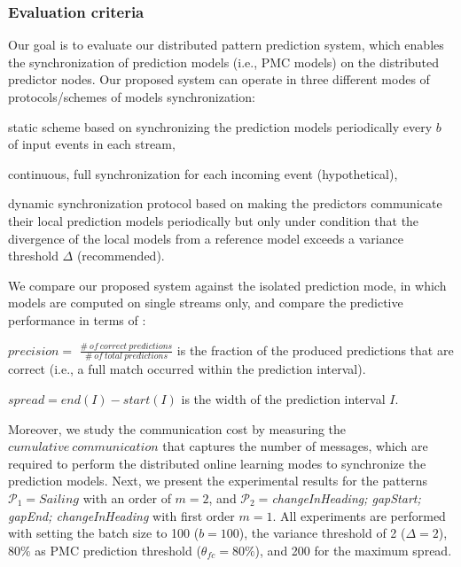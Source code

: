 \subsubsection*{Evaluation criteria} Our goal is to evaluate our distributed pattern prediction system, which enables the synchronization of prediction models (i.e., PMC models) on the distributed predictor nodes. Our proposed system can operate in three different modes of  protocols/schemes of models synchronization: \begin{enumerate*}[label=(\roman*)] 
	\item static scheme based on synchronizing the prediction models periodically every $b$ of input events in each stream, 
\item continuous, full synchronization for each incoming event (hypothetical), 
\item dynamic synchronization protocol based on making the predictors communicate their local prediction models periodically but only under condition that the divergence of the local models from a reference model exceeds a variance threshold $\Delta$ (recommended).  	   

\end{enumerate*}
\par We compare our proposed system against the isolated prediction mode, in which models are computed on single streams only, and compare the predictive performance in terms of :
\begin{enumerate*}[label=(\roman*)]
	
\item  $\mathit{precision} =$ $ \mathit{\frac{\#\ of\ correct\ predictions}{\#\ of\ total\ predictions}}$ is the fraction of the produced predictions that are correct (i.e., a full match occurred within the prediction interval).   

\item $\mathit{spread} =end(I) -start(I)$ is the width of the prediction interval $I$. 

\end{enumerate*} 
\par Moreover, we study the communication cost by measuring the $\mathit{cumulative\ communication}$ that captures the number of messages, which are required to perform the distributed online learning modes to synchronize the prediction models. Next, we present the experimental results for the patterns  $\mathcal{P}_1=Sailing$ with an order of $m=2$, and   $\mathcal{P}_2=$\textit{changeInHeading; gapStart; gapEnd; changeInHeading} with first order $m=1$. All experiments are performed with setting the batch size to 100  ($b=100$), the variance threshold of 2 ($\Delta=2$), $80\%$ as PMC prediction threshold ($\theta_{fc}=80\%$), and 200 for the maximum spread.

